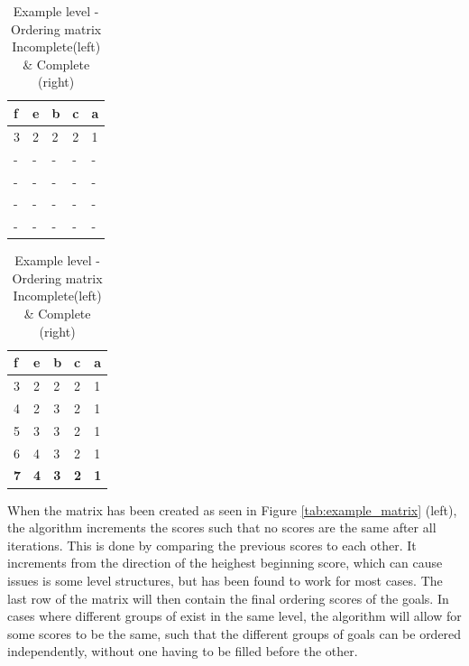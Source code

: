 \begin{table}[!htb]
	\label{tab:example_matrix}
    \caption{\centering Example level - Ordering matrix \break Incomplete(left) \& Complete (right)}
	\begin{minipage}{.5\linewidth}
      \centering
	  	\label{fig:scores_2}
		\begin{tabular}{lllll}
		\hline
		\textbf{f} & \textbf{e} & \textbf{b} & \textbf{c} & \textbf{a} \\ \hline
		3          & 2          & 2          & 2          & 1          \\ 
		-          & -          & -          & -          & -          \\ 
		-          & -          & -          & -          & -          \\ 
		-          & -          & -          & -          & -          \\ 
		-          & -          & -          & -          & -          \\ \hline
		\end{tabular}
    \end{minipage}%
    \begin{minipage}{.5\linewidth}
      \centering
		\label{fig:scores_2}
		\begin{tabular}{lllll}
		\hline
		\textbf{f} & \textbf{e} & \textbf{b} & \textbf{c} & \textbf{a} \\ \hline
		3          & 2          & 2          & 2          & 1          \\ 
		4          & 2          & 3          & 2          & 1          \\ 
		5          & 3          & 3          & 2          & 1          \\ 
		6          & 4          & 3          & 2          & 1          \\ \hline
		\textbf{7} & \textbf{4} & \textbf{3} & \textbf{2} & \textbf{1} \\ \hline
		\end{tabular}
    \end{minipage} 
\end{table}


When the matrix has been created as seen in Figure \ref{tab:example_matrix} (left), the algorithm increments the scores such that no scores are the same after all iterations. This is done by comparing the previous scores to each other. It increments from the direction of the heighest beginning score, which can cause issues is some level structures, but has been found to work for most cases. The last row of the matrix will then contain the final ordering scores of the goals. In cases where different groups of exist in the same level, the algorithm will allow for some scores to be the same, such that the different groups of goals can be ordered independently, without one having to be filled before the other. 

